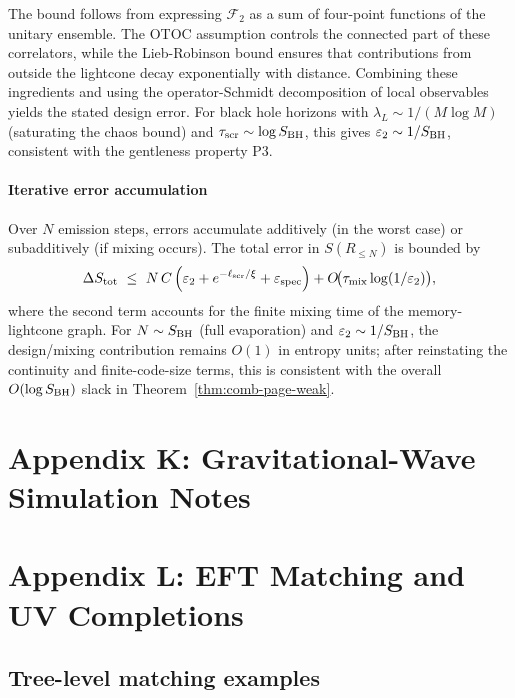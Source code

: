\documentclass[a4paper,11pt]{article}
\theoremstyle{plain}
\theoremstyle{definition}
\theoremstyle{remark}
\begin{document}
The bound follows from expressing $\mathcal{F}_2$ as a sum of four-point functions of the unitary ensemble. The OTOC assumption controls the connected part of these correlators, while the Lieb-Robinson bound ensures that contributions from outside the lightcone decay exponentially with distance. Combining these ingredients and using the operator-Schmidt decomposition of local observables yields the stated design error. For black hole horizons with $\lambda_L \sim 1/(M \log M)$ (saturating the chaos bound) and $\tau_{\rm scr} \sim \log S_{\rm BH}$, this gives $\varepsilon_2 \sim 1/S_{\rm BH}$, consistent with the gentleness property P3.

\paragraph{Iterative error accumulation}
Over $N$ emission steps, errors accumulate additively (in the worst case) or subadditively (if mixing occurs). The total error in $S(R_{\le N})$ is bounded by
\begin{equation}
\Delta S_{\rm tot} \ \le\ N\, C\left(\varepsilon_2 + e^{-\ell_{\rm scr}/\xi} + \varepsilon_{\rm spec}\right) + O\!\big(\tau_{\rm mix} \log(1/\varepsilon_2)\big),
\end{equation}
where the second term accounts for the finite mixing time of the memory-lightcone graph. For $N \sim S_{\rm BH}$ (full evaporation) and $\varepsilon_2 \sim 1/S_{\rm BH}$, the design/mixing contribution remains $O(1)$ in entropy units; after reinstating the continuity and finite-code-size terms, this is consistent with the overall \(O(\log S_{\rm BH})\) slack in Theorem~\ref{thm:comb-page-weak}.


\section{Appendix K: Gravitational-Wave Simulation Notes}
\label{app:gw-sim}

\section{Appendix L: EFT Matching and UV Completions}\label{app:new-physics-eft}

\subsection{Tree-level matching examples}
\end{document}
